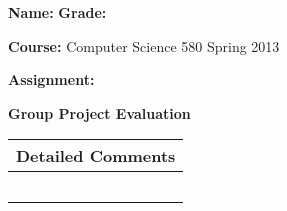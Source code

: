 \documentclass[letterpaper, 10pt]{article} %
\begin{document}
\pagestyle{empty}

\vspace*{-1.2in}

\noindent
{\bf Name:} \hspace*{4.8in} {\bf Grade:} 

\vspace*{.1in}

\noindent
{\bf Course:} Computer Science 580 Spring 2013

\vspace*{.1in}

\noindent
{\bf Assignment:} 

\vspace*{.1in}

\large{

\begin{center}{\bf Group Project Evaluation} \end{center}

\begin{tabular}{l}

\begin{minipage}{6in} \hspace*{-.25in} {\bf Detailed Comments} \vspace*{.25in} \end{minipage} \\ \hline

\begin{minipage}{6in} \vspace*{.25in} \end{minipage} \\ \hline

\begin{minipage}{6in} \vspace*{.25in} \end{minipage} \\ \hline

\begin{minipage}{6in} \vspace*{.25in} \end{minipage} \\ \hline

\begin{minipage}{6in} \vspace*{.25in} \end{minipage} \\ \hline

\begin{minipage}{6in} \vspace*{.25in} \end{minipage} \\ \hline


\end{tabular}}
\end{document}
